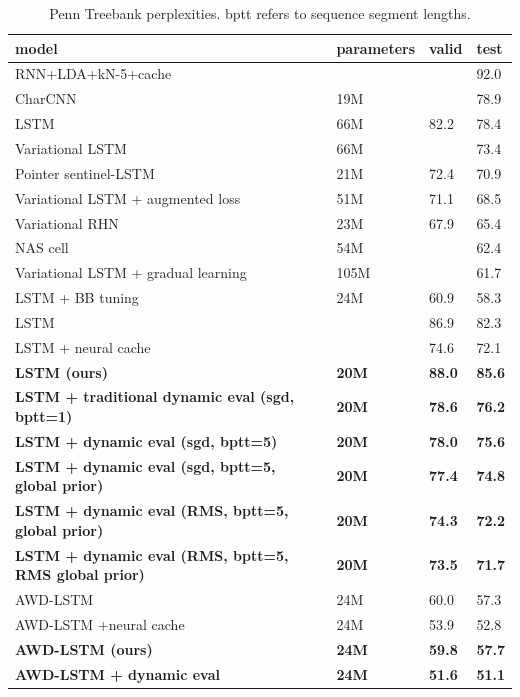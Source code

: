 \documentclass{article}
\begin{document}
\begin{table}[tb]
\begin{center} 
\begin{tabular}{  l  l  l  l } \toprule 
model & parameters & valid & test  \\ 
\midrule 
RNN+LDA+kN-5+cache \citep{Mikolov2012b}& & & 92.0 \\ 
CharCNN \citep{Kim2015} & 19M & & 78.9 \\
LSTM \citep{Zaremba-2014} & 66M & 82.2 & 78.4 \\
Variational LSTM \citep{gal2016} &66M & & 73.4 \\
Pointer sentinel-LSTM \citep{Merity2016} &21M & 72.4 & 70.9 \\
Variational LSTM + augmented loss \citep{inan2017}& 51M &71.1 & 68.5 \\
Variational RHN \citep{zilly2017}& 23M & 67.9 & 65.4\\
NAS cell  \citep{zoph2017} &54M & & 62.4 \\
Variational LSTM + gradual learning \citep{aharoni2017} & 105M & & 61.7 \\
LSTM + BB tuning \citep{melis2017}& 24M & 60.9 & 58.3 \\
\midrule
LSTM \citep{grave2017}& & 86.9 & 82.3 \\
LSTM + neural cache \citep{grave2017}& & 74.6 & 72.1 \\
\textbf{LSTM (ours)} & \textbf{20M} & \textbf{88.0} & \textbf{85.6} \\
\textbf{LSTM + traditional dynamic eval (sgd, bptt=1)}& \textbf{20M} & \textbf{78.6} & \textbf{76.2}\\
\textbf{LSTM + dynamic eval (sgd, bptt=5)}& \textbf{20M} & \textbf{78.0} & \textbf{75.6}\\
\textbf{LSTM + dynamic eval (sgd, bptt=5, global prior)}& \textbf{20M} & \textbf{77.4} & \textbf{74.8}\\
\textbf{LSTM + dynamic eval (RMS, bptt=5, global prior)}& \textbf{20M} & \textbf{74.3} & \textbf{72.2}\\
\textbf{LSTM + dynamic eval (RMS, bptt=5, RMS global prior)}& \textbf{20M} & \textbf{73.5} & \textbf{71.7}\\
\midrule
AWD-LSTM \citep{merity2017}& 24M & 60.0 & 57.3 \\
AWD-LSTM +neural cache \citep{merity2017}& 24M & 53.9 & 52.8 \\
\textbf{AWD-LSTM (ours)} & \textbf{24M} & \textbf{59.8} & \textbf{57.7} \\
\textbf{AWD-LSTM + dynamic eval}& \textbf{24M} & \textbf{51.6} & \textbf{51.1}\\
\bottomrule
\end{tabular} 
\end{center}
\caption{Penn Treebank perplexities. bptt refers to sequence segment lengths.}
\label{tab:ptb}
\end{table}
\end{document}
